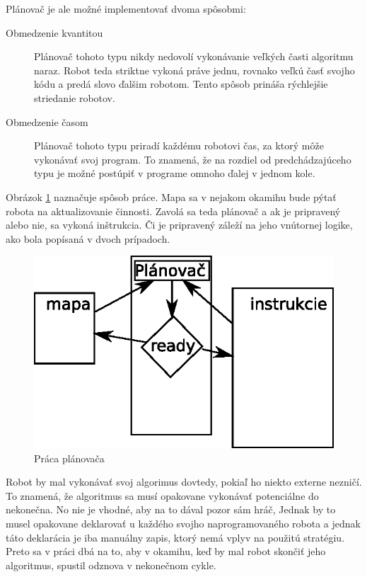 Plánovač je ale možné implementovať dvoma spôsobmi:
\begin{description}
\item [Obmedzenie kvantitou] \hfill \newline
Plánovač tohoto typu nikdy nedovolí vykonávanie veľkých časti algoritmu naraz. Robot teda striktne vykoná práve jednu, rovnako veľkú  časť svojho kódu a predá slovo ďalšim robotom. Tento spôsob prináša rýchlejšie striedanie robotov.
\item [Obmedzenie časom] \hfill \newline
Plánovač tohoto typu priradí každému robotovi čas, za ktorý môže vykonávať svoj program. To znamená, že na rozdiel od predchádzajúceho typu je možné postúpiť v programe omnoho ďalej v jednom kole.
\end{description} 
Obrázok \ref{fig::planovac} naznačuje spôsob práce. Mapa sa v nejakom okamihu bude pýtať robota na aktualizovanie činnosti. Zavolá sa teda plánovač a ak je pripravený alebo nie, sa vykoná inštrukcia. Či je pripravený záleží na jeho vnútornej logike, ako bola popísaná v dvoch prípadoch.
\begin{figure}
\centering
\includegraphics{planovac.eps}
\caption{ Práca plánovača }
\label{fig::planovac}
\end{figure}
Robot by mal vykonávať svoj algorimus dovtedy, pokiaľ ho niekto externe nezničí. To znamená, že algoritmus sa musí opakovane vykonávať potenciálne do nekonečna. No nie je vhodné, aby na to dával pozor sám hráč, Jednak by to musel opakovane deklarovať u každého svojho naprogramovaného robota a jednak táto deklarácia je iba manuálny zapis, ktorý nemá vplyv na použitú stratégiu. Preto sa v práci dbá na to, aby v okamihu, keď by mal robot skončiť  jeho algoritmus, spustil odznova v nekonečnom cykle.%

